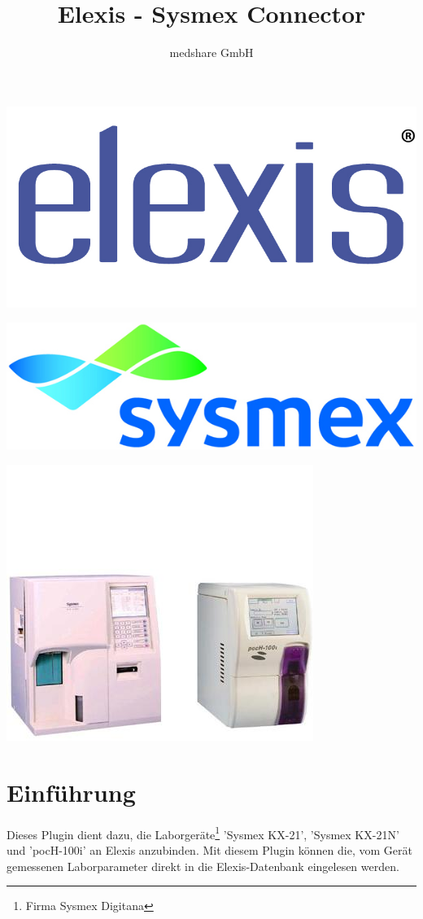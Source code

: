 \documentclass[a4paper]{scrartcl}
\title{Elexis - Sysmex Connector}
\author{medshare GmbH}
\begin{document}
\maketitle
	\begin{center}
		\includegraphics{elexis_logo}
	\end{center}
	\begin{center}
		\includegraphics{sysmex_logo}
	\end{center}
	\begin{center}
		\includegraphics{sysmex_device}
	\end{center}
\pagebreak


\section{Einf\"uhrung}
Dieses Plugin dient dazu, die Laborger\"ate\footnote{Firma Sysmex Digitana} 'Sysmex KX-21', 'Sysmex KX-21N' und 'pocH-100i' an Elexis anzubinden. Mit diesem Plugin k\"onnen die, vom Ger\"at gemessenen Laborparameter direkt in die Elexis-Datenbank eingelesen werden.
\end{document}
